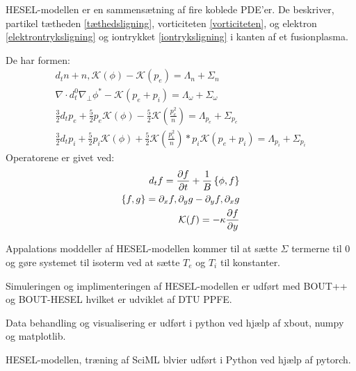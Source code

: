 HESEL-modellen er en sammensætning af fire koblede PDE'er. De beskriver, partikel tætheden \ref{tæthedsligning}, vorticiteten \ref{vorticiteten}, og elektron \ref{elektrontryksligning} og iontrykket \ref{iontryksligning} i kanten af et fusionplasma.

De har formen:
\begin{align}
    d_t n + n,\mathcal{K}(\phi) - \mathcal{K}(p_e) = \Lambda_n + \Sigma_n \label{tæthedsligning} \\
    \nabla \cdot d_t^0 \nabla_\perp \phi^* - \mathcal{K}(p_e+p_i)=\Lambda_\omega+\Sigma_\omega \label{vorticiteten} \\
    \frac{3}{2}d_t p_e + \frac{5}{2}p_e \mathcal{K}(\phi) -\frac{5}{2}\mathcal{K}\left(\frac{p_e^2}{n}\right)= \Lambda_{p_e}+\Sigma_{p_e} \label{elektrontryksligning} \\
    \frac{3}{2}d_t p_i + \frac{5}{2}p_i \mathcal{K}(\phi) +\frac{5}{2}\mathcal{K}\left(\frac{p_i^2}{n}\right) * p_i\mathcal{K}(p_e+p_i) = \Lambda_{p_i}+\Sigma_{p_i} \label{iontryksligning}
\end{align}
Operatorene er givet ved:
\begin{align}
    d_t f = \frac{\partial f}{\partial t} + \frac{1}{B}  \left\{ \phi , f \right\}\notag \\
    \left\{ f, g\right\} = \partial_x f ,\partial_y g - \partial_y f ,\partial_x g \notag \\
    \mathcal{K}(f)= -\kappa \frac{\partial f}{\partial y} \notag
\end{align}

Appalations moddeller af HESEL-modellen kommer til at sætte $\Sigma$ termerne til 0 og gøre systemet til isoterm ved at sætte $T_e$ og $T_i$ til konstanter.

Simuleringen og implimenteringen af HESEL-modellen er udført med BOUT++ og BOUT-HESEL hvilket er udviklet af DTU PPFE.

Data behandling og visualisering er udført i python ved hjælp af xbout, numpy og matplotlib.

HESEL-modellen, træning af SciML blvier udført i Python ved hjælp af pytorch.

